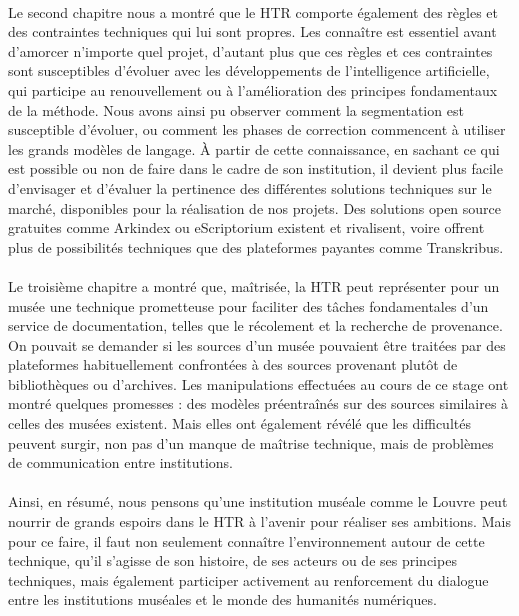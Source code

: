 \documentclass[a4paper,12pt,twoside]{book}
\begin{document}
\paragraph{}
Le second chapitre nous a montré que le HTR comporte également des règles et des contraintes techniques qui lui sont propres. Les connaître est essentiel avant d’amorcer n’importe quel projet, d’autant plus que ces règles et ces contraintes sont susceptibles d’évoluer avec les développements de l'intelligence artificielle, qui participe au renouvellement ou à l’amélioration des principes fondamentaux de la méthode. Nous avons ainsi pu observer comment la segmentation est susceptible d’évoluer, ou comment les phases de correction commencent à utiliser les grands modèles de langage. À partir de cette connaissance, en sachant ce qui est possible ou non de faire dans le cadre de son institution, il devient plus facile d’envisager et d’évaluer la pertinence des différentes solutions techniques sur le marché, disponibles pour la réalisation de nos projets. Des solutions open source gratuites comme Arkindex ou eScriptorium existent et rivalisent, voire offrent plus de possibilités techniques que des plateformes payantes comme Transkribus.

\paragraph{}
Le troisième chapitre a montré que, maîtrisée, la HTR peut représenter pour un musée une technique prometteuse pour faciliter des tâches fondamentales d’un service de documentation, telles que le récolement et la recherche de provenance. On pouvait se demander si les sources d’un musée pouvaient être traitées par des plateformes habituellement confrontées à des sources provenant plutôt de bibliothèques ou d’archives. Les manipulations effectuées au cours de ce stage ont montré quelques promesses : des modèles préentraînés sur des sources similaires à celles des musées existent. Mais elles ont également révélé que les difficultés peuvent surgir, non pas d’un manque de maîtrise technique, mais de problèmes de communication entre institutions.

\paragraph{}
Ainsi, en résumé, nous pensons qu’une institution muséale comme le Louvre peut nourrir de grands espoirs dans le HTR à l’avenir pour réaliser ses ambitions. Mais pour ce faire, il faut non seulement connaître l’environnement autour de cette technique, qu’il s’agisse de son histoire, de ses acteurs ou de ses principes techniques, mais également participer activement au renforcement du dialogue entre les institutions muséales et le monde des humanités numériques. 
\end{document}
